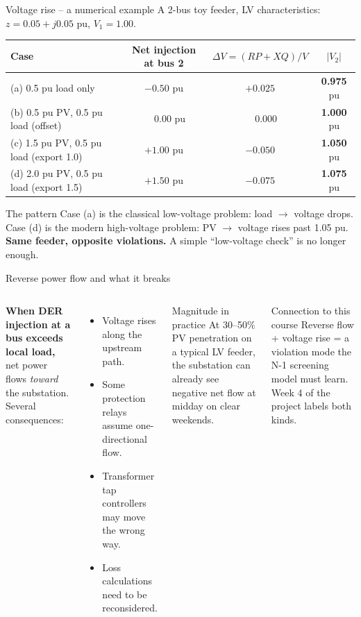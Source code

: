 \documentclass[aspectratio=169,10pt]{beamer}
\begin{document}
\begin{frame}{Voltage rise -- a numerical example}
A 2-bus toy feeder, LV characteristics: $z = 0.05 + j0.05$ pu, $V_1 = 1.00$.
\vspace{0.3em}
\centering
\small
\begin{tabular}{lccc}
\toprule
Case & Net injection at bus 2 & $\Delta V = (RP + XQ)/V$ & $|V_2|$ \\
\midrule
(a) 0.5 pu load only & $-0.50$ pu & $+0.025$ & \textbf{0.975} pu \\
(b) 0.5 pu PV, 0.5 pu load (offset) & $\phantom{-}0.00$ pu & $\phantom{+}0.000$ & \textbf{1.000} pu \\
(c) 1.5 pu PV, 0.5 pu load (export 1.0) & $+1.00$ pu & $-0.050$ & \textbf{1.050} pu \\
(d) 2.0 pu PV, 0.5 pu load (export 1.5) & $+1.50$ pu & $-0.075$ & \textbf{1.075} pu \\
\bottomrule
\end{tabular}
\vspace{0.6em}
\begin{alertblock}{The pattern}
Case (a) is the classical low-voltage problem: load $\rightarrow$ voltage drops.\\
Case (d) is the modern high-voltage problem: PV $\rightarrow$ voltage rises past 1.05 pu.\\
\textbf{Same feeder, opposite violations.} A simple ``low-voltage check'' is no longer enough.
\end{alertblock}
\end{frame}

\begin{frame}{Reverse power flow and what it breaks}
\begin{columns}[T]
\textbf{When DER injection at a bus exceeds local load,} net power flows \emph{toward} the substation. Several consequences:
\begin{itemize}
  \item Voltage rises along the upstream path.
  \item Some protection relays assume one-directional flow.
  \item Transformer tap controllers may move the wrong way.
  \item Loss calculations need to be reconsidered.
\end{itemize}
\begin{block}{Magnitude in practice}
At 30--50\% PV penetration on a typical LV feeder, the substation can already see negative net flow at midday on clear weekends.
\end{block}
\begin{alertblock}{Connection to this course}
Reverse flow + voltage rise = a violation mode the N-1 screening model must learn. Week 4 of the project labels both kinds.
\end{alertblock}
\end{columns}
\end{frame}
\end{document}
